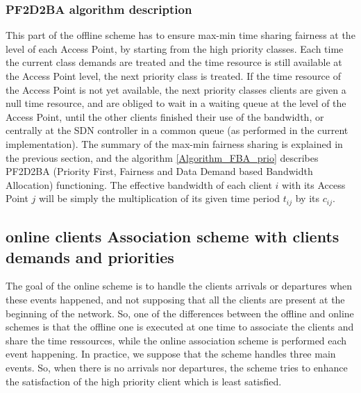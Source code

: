 \documentclass[journal,transmag]{IEEEtran}
\begin{document}
\subsubsection{PF2D2BA algorithm description}
This part of the offline scheme has to ensure max-min time sharing fairness at the level of each Access Point, by starting from the high priority classes. Each time the current class demands are treated and the time resource is still available at the Access Point level, the next priority class is treated. If the time resource of the Access Point is not yet available, the next priority classes clients are given a null time resource, and are obliged to wait in a waiting queue at the level of the Access Point, until the other clients finished their use of the bandwidth, or centrally at the SDN controller in a common queue (as performed in the current implementation). The summary of the max-min fairness sharing is explained in the previous section, and the algorithm \ref{Algorithm_FBA_prio} describes PF2D2BA (Priority First, Fairness and Data Demand based Bandwidth Allocation) functioning. The effective bandwidth of each client $i$ with its Access Point $j$ will be simply the multiplication of its given time period $t_{ij}$ by its $c_{ij}$.      
 


\subsection{online clients Association scheme with clients demands and priorities}
The goal of the online scheme is to handle the clients arrivals or departures when these events happened, and not supposing that all the clients are present at the beginning of the network. So, one of the differences between the offline and online schemes is that the offline one is executed at one time to associate the clients and share the time ressources, while the online association scheme is performed each event happening. 
In practice, we suppose that the scheme handles three main events. So, when there is no arrivals nor departures, the scheme tries to enhance the satisfaction of the high priority client which is least  satisfied. 
\end{document}
